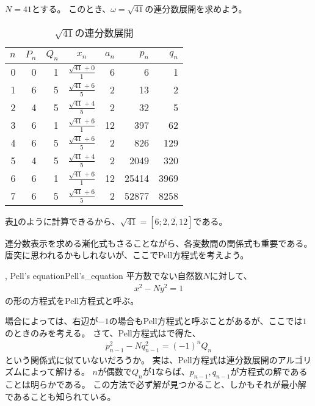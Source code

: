 \begin{Exam}{}{}
$N=41$とする。
このとき、$\omega=\sqrt{41}$の連分数展開を求めよう。
\begin{table}[htb]
\centering
\caption{$\sqrt{41}$の連分数展開}
\label{tb:sqrt41_continued_fraction}
\begin{tabular}{|r|r|r|c|r|r|r|}
\hline
$n$ & $P_n$ & $Q_n$ & $x_n$                   & $a_n$ & $p_n$ & $q_n$ \\ \hline
0   & 0     & 1     & $\frac{\sqrt{41}+0}{1}$ & 6     & 6     & 1     \\ \hline
1   & 6     & 5     & $\frac{\sqrt{41}+6}{5}$ & 2     & 13    & 2     \\ \hline
2   & 4     & 5     & $\frac{\sqrt{41}+4}{5}$ & 2     & 32    & 5     \\ \hline
3   & 6     & 1     & $\frac{\sqrt{41}+6}{1}$ & 12    & 397   & 62    \\ \hline
4   & 6     & 5     & $\frac{\sqrt{41}+6}{5}$ & 2     & 826   & 129   \\ \hline
5   & 4     & 5     & $\frac{\sqrt{41}+4}{5}$ & 2     & 2049  & 320   \\ \hline
6   & 6     & 1     & $\frac{\sqrt{41}+6}{1}$ & 12    & 25414 & 3969  \\ \hline
7   & 6     & 5     & $\frac{\sqrt{41}+6}{5}$ & 2     & 52877 & 8258  \\ \hline
\end{tabular}
\end{table}
表\ref{tb:sqrt41_continued_fraction}のように計算できるから、$\sqrt{41}=[6;\overline{2,2,12}]$である。
\end{Exam}

連分数表示を求める漸化式もさることながら、各変数間の関係式も重要である。
唐突に思われるかもしれないが、ここでPell方程式を考えよう。

\begin{Defi}{, Pell's equation}{Pell's_equation}
平方数でない自然数$N$に対して、
\begin{align*}
x^2 - Ny^2 = 1
\end{align*}
の形の方程式をPell方程式と呼ぶ。
\end{Defi}

場合によっては、右辺が$-1$の場合もPell方程式と呼ぶことがあるが、ここでは$1$のときのみを考える。
さて、Pell方程式はで得た、
\begin{align*}
p_{n-1}^2 - N q_{n-1}^2 = (-1)^n Q_n
\end{align*}
という関係式に似ていないだろうか。
実は、Pell方程式は連分数展開のアルゴリズムによって解ける。
$n$が偶数で$Q_n$が1ならば、$p_{n-1},q_{n-1}$が方程式の解であることは明らかである。
この方法で必ず解が見つかること、しかもそれが最小解であることも知られている。

